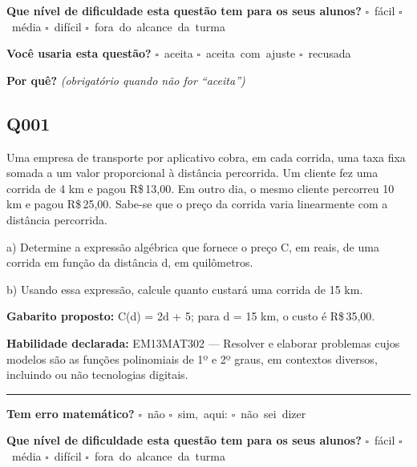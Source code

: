 \documentclass[11pt,a4paper]{article}
\begin{document}
\textbf{Que nível de dificuldade esta questão tem para os seus alunos?}\quad
\mbox{$\square$~fácil} \quad \mbox{$\square$~média} \quad
\mbox{$\square$~difícil} \quad \mbox{$\square$~fora do alcance da turma}

\textbf{Você usaria esta questão?}\quad
\mbox{$\square$~aceita} \quad \mbox{$\square$~aceita com ajuste} \quad
\mbox{$\square$~recusada}

\textbf{Por quê?} \emph{(obrigatório quando não for ``aceita'')}

\underline{\hspace{\linewidth}}

\underline{\hspace{\linewidth}}
\vspace{0.6em}

\begin{samepage}
\subsection*{Q001}
Uma empresa de transporte por aplicativo cobra, em cada corrida, uma taxa fixa somada a um valor proporcional à distância percorrida. Um cliente fez uma corrida de 4 km e pagou R\$\,13,00. Em outro dia, o mesmo cliente percorreu 10 km e pagou R\$\,25,00. Sabe-se que o preço da corrida varia linearmente com a distância percorrida.

a) Determine a expressão algébrica que fornece o preço C, em reais, de uma corrida em função da distância d, em quilômetros.

b) Usando essa expressão, calcule quanto custará uma corrida de 15 km.

\textbf{Gabarito proposto:} C(d) = 2d + 5; para d = 15 km, o custo é R\$\,35,00.

\textbf{Habilidade declarada:} EM13MAT302 --- Resolver e elaborar problemas cujos modelos são as funções polinomiais de 1º e 2º graus, em contextos diversos, incluindo ou não tecnologias digitais.
\end{samepage}

\noindent\rule{\linewidth}{0.4pt}
\textbf{Tem erro matemático?}\quad
\mbox{$\square$~não} \quad \mbox{$\square$~sim, aqui:} \underline{\hspace{5cm}}
\quad \mbox{$\square$~não sei dizer}

\textbf{Que nível de dificuldade esta questão tem para os seus alunos?}\quad
\mbox{$\square$~fácil} \quad \mbox{$\square$~média} \quad
\mbox{$\square$~difícil} \quad \mbox{$\square$~fora do alcance da turma}
\end{document}
